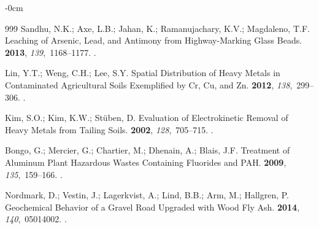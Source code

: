 \documentclass[algorithms,article,accept,pdftex,moreauthors]{Definitions/mdpi}
\begin{document}
\begin{adjustwidth}{-\extralength}{0cm}
\begin{thebibliography}{999}
Sandhu, N.K.; Axe, L.B.; Jahan, K.; Ramanujachary, K.V.; Magdaleno, T.F.
\newblock Leaching of Arsenic, Lead, and Antimony from Highway-Marking Glass
  Beads.
 {\bf 2013}, {\em
  139},~1168--1177.
.

Lin, Y.T.; Weng, C.H.; Lee, S.Y.
\newblock Spatial Distribution of Heavy Metals in Contaminated Agricultural
  Soils Exemplified by Cr, Cu, and Zn.
 {\bf 2012}, {\em
  138},~299--306.
.

Kim, S.O.; Kim, K.W.; Stüben, D.
\newblock Evaluation of Electrokinetic Removal of Heavy Metals from Tailing
  Soils.
 {\bf 2002}, {\em
  128},~705--715.
.

\clearpage 
{}
Bongo, G.; Mercier, G.; Chartier, M.; Dhenain, A.; Blais, J.F.
\newblock Treatment of Aluminum Plant Hazardous Wastes Containing Fluorides and
  PAH.
 {\bf 2009}, {\em
  135},~159--166.
.

 
Nordmark, D.; Vestin, J.; Lagerkvist, A.; Lind, B.B.; Arm, M.; Hallgren, P.
\newblock Geochemical Behavior of a Gravel Road Upgraded with Wood Fly Ash.
 {\bf 2014}, {\em
  140},~05014002.
.

\end{thebibliography}
\PublishersNote{}


\end{adjustwidth}
\end{document}
